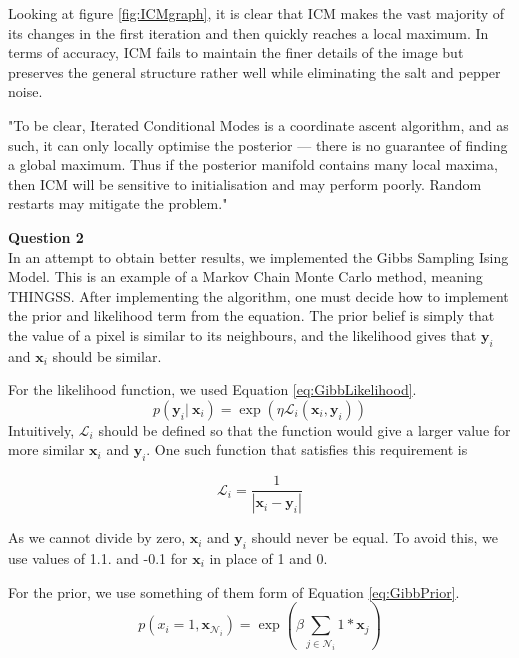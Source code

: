 \documentclass[10pt, a4paper, twocolumn]{article} %
\begin{document}
Looking at figure \ref{fig:ICMgraph}, it is clear that ICM makes the vast majority of its changes in the first iteration and then quickly reaches a local maximum. In terms of accuracy, ICM fails to maintain the finer details of the image but preserves the general structure rather well while eliminating the salt and pepper noise. 

"To be clear, Iterated Conditional Modes is a coordinate ascent algorithm, and as such, it can only locally optimise the posterior — there is no guarantee of finding a global maximum. Thus if the posterior manifold contains many local maxima, then ICM will be sensitive to initialisation and may perform poorly. Random restarts may mitigate the problem."

\textbf{Question 2}\\
In an attempt to obtain better results, we implemented the Gibbs Sampling Ising Model. This is an example of a Markov Chain Monte Carlo method, meaning THINGSS. After implementing the algorithm, one must decide how to implement the prior and likelihood term from the equation. The prior belief is simply that the value of a pixel is similar to its neighbours, and the likelihood gives that $\textbf{y}_i$ and $\textbf{x}_i$ should be similar. 


For the likelihood function, we used Equation \ref{eq:GibbLikelihood}.
\begin{equation}
    p(\textbf{y}_i |\ \textbf{x}_i) = \exp(\eta \mathcal{L}_i (\textbf{x}_i, \textbf{y}_i))
    \label{eq:GibbLikelihood}
\end{equation}
Intuitively,  $\mathcal{L}_i$ should be defined so that the function would give a larger value for more similar $\textbf{x}_i$ and $\textbf{y}_i$. One such function that satisfies this requirement is 

\begin{equation}
    \mathcal{L}_i = \frac{1}{|\textbf{x}_i - \textbf{y}_i|}
\end{equation}

As we cannot divide by zero, $\textbf{x}_i$ and $\textbf{y}_i$ should never be equal. To avoid this, we use values of 1.1. and -0.1 for $\textbf{x}_i$ in place of 1 and 0.

For the prior, we use something of them form of Equation \ref{eq:GibbPrior}.
\begin{equation}
    \label{eq:GibbPrior}
    p(x_i = 1, \textbf{x}_\mathcal{N}_i) = \exp\left({\beta \sum_{j\in\mathcal{N}_i} 1 * \textbf{x}_ j}\right)
\end{equation}
\end{document}
